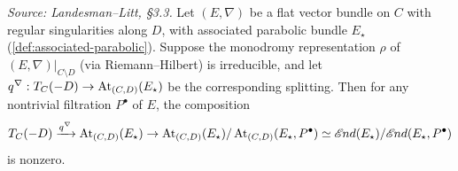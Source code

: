 \begin{proposition}
  \label{prop:irreducibility-splitting}
  \textit{Source: Landesman--Litt, \S3.3.}
  Let $(E,\nabla)$ be a flat vector bundle on $C$ with regular singularities
  along $D$, with associated parabolic bundle $E_\star$
  (\cref{def:associated-parabolic}). Suppose the monodromy representation
  $\rho$ of $(E,\nabla)|_{C \setminus D}$ (via Riemann--Hilbert) is irreducible,
  and let $q^\nabla: T_C(-D) \to \operatorname{At}_{(C,D)}(E_\star)$ be the corresponding
  splitting. Then for any nontrivial filtration $P^\bullet$ of $E$, the
  composition
  \[
    T_C(-D) \xrightarrow{q^\nabla} \operatorname{At}_{(C,D)}(E_\star)
    \to \operatorname{At}_{(C,D)}(E_\star)/\operatorname{At}_{(C,D)}(E_\star,P^\bullet)
    \simeq \mathscr{E}\kern -1pt nd(E_\star)/\mathscr{E}\kern -1pt nd(E_\star,P^\bullet)
  \]
  is nonzero.
\end{proposition}
